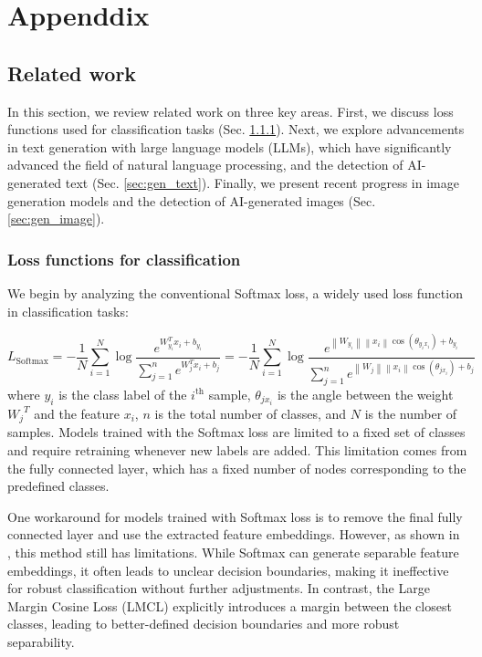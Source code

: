 \section{Appenddix}
\label{sec:appendix}
\subsection{Related work}
\label{sec:appendix_related_work}
In this section, we review related work on three key areas. First, we discuss 
loss functions used for classification tasks (Sec. \ref{sec:lmcl}). 
Next, we explore advancements in text generation with large language models (LLMs), which have significantly advanced the field of natural language processing, and the detection of AI-generated text (Sec. \ref{sec:gen_text}). Finally, we present recent progress in image generation models and the detection of AI-generated images (Sec. \ref{sec:gen_image}).


\subsubsection{Loss functions for classification}
\label{sec:lmcl}
We begin by analyzing the conventional Softmax loss, a widely used loss function in classification tasks:

\begin{equation}
\label{eq:softmax}
    L_{\text{Softmax}}=-\frac{1}{N}\sum\limits_{i=1}^{N}{\log }\frac{{{e}^{W_{{{y}_{i}}}^{T}{{x}_{i}}+{{b}_{{{y}_{i}}}}}}}{\sum\limits_{j=1}^{n}{{{e}^{W_{j}^{T}{{x}_{i}}+{{b}_{j}}}}}}
    =
    -\frac{1}{N}\sum\limits_{i=1}^{N}{\log }\frac{{{e}^{\left\| {W_{{{y}_{i}}}} \right\|\left\| {{x}_{i}} \right\|\cos \left( {{\theta }_{y_i x_i}} \right)+{{b}_{{{y}_{i}}}}}}}{\sum\limits_{j=1}^{n}{{{e}^{\left\| {W_j} \right\|\left\| {{x}_{i}} \right\|\cos \left( {{\theta }_{j x_i}} \right)+{{b}_{j}}}}}}
\end{equation}
where ${{y}_{i}}$ is the class label of the $i^{\text{th}}$ sample, ${{\theta }_{j x_i}}$ is the angle between the weight ${{W}_{j}}^{T}$ and the feature ${{x}_{i}}$, $n$ is the total number of classes, and $N$ is the number of samples. Models trained with the Softmax loss are limited to a fixed set of classes and require retraining whenever new labels are added. This limitation comes from the fully connected layer, which has a fixed number of nodes corresponding to the predefined classes.


One workaround for models trained with Softmax loss is to remove the final fully connected layer and use the extracted feature embeddings. However, as shown in \cite{deng2019arcface}, this method still has limitations. While Softmax can generate separable feature embeddings, it often leads to unclear decision boundaries, making it ineffective for robust classification without further adjustments. In contrast, the Large Margin Cosine Loss (LMCL) explicitly introduces a margin between the closest classes, leading to better-defined decision boundaries and more robust separability.

